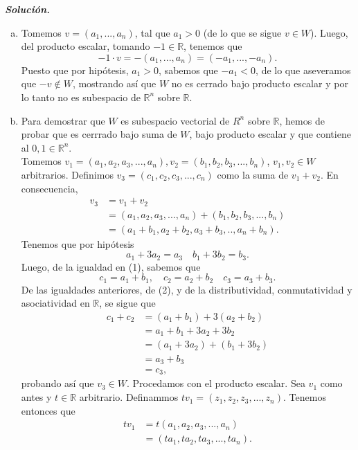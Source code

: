 \documentclass[11pt]{scrartcl}
\begin{document}
\textit{\textbf{Solución.}}
    \begin{enumerate}[a)]
        \item Tomemos $v=(a_1,...,a_n)$, tal que $a_1>0$ (de lo que se sigue $v\in W$). Luego, del producto escalar, tomando $-1\in \mathbb{R}$, tenemos que
        \[
        -1\cdot v=-(a_1,...,a_n)=(-a_1,...,-a_n).
        \]
        Puesto que por hipótesis, $a_1 > 0$, sabemos que $-a_1<0$, de lo que aseveramos que $-v\notin W$, mostrando así
        que $W$ no es cerrado bajo producto escalar y por lo tanto no es subespacio de $\mathbb{R}^n$ sobre $\mathbb{R}$.
        \item Para demostrar que $W$ es subespacio vectorial de $R^n$ sobre $\mathbb{R}$, hemos de probar que es cerrrado bajo suma de $W$, bajo producto escalar y que contiene al $0,1\in \mathbb{R}^n$.
        \\ Tomemos $v_1=(a_1,a_2,a_3,...,a_n),v_2=(b_1,b_2,b_3,...,b_n)$, $v_1,v_2 \in W$ arbitrarios. Definimos $v_3=(c_1,c_2,c_3,...,c_n)$ como la suma de $v_1+v_2$. En consecuencia,
        \begin{align*}
            v_3&=v_1+v_2 \\
            &=(a_1,a_2,a_3,...,a_n)+(b_1,b_2,b_3,...,b_n)\\
            &=(a_1+b_1,a_2+b_2,a_3+b_3,..,a_n+b_n). \tag{1}
        \end{align*}
        Tenemos que por hipótesis
        \[
        a_1+3a_2=a_3 \quad b_1+3b_2=b_3. \tag{2}
        \]
        Luego, de la igualdad en (1), sabemos que
        \[
        c_1=a_1+b_1, \quad c_2=a_2+b_2 \quad c_3=a_3+b_3.
        \]
        De las igualdades anteriores, de (2), y de la distributividad, conmutatividad y asociatividad en $\mathbb{R}$, se sigue que
        \begin{align*}
            c_1+c_2&=(a_1+b_1)+3(a_2+b_2) \\
            &=a_1+b_1+3a_2+3b_2 \\
            &=(a_1+3a_2)+(b_1+3b_2) \\
            &=a_3+b_3 \\
            &=c_3,
        \end{align*}
        probando así que $v_3 \in W$. Procedamos con el producto escalar. Sea $v_1$ como antes y $t\in \mathbb{R}$ arbitrario. Definammos $tv_1=(z_1,z_2,z_3,...,z_n)$.
        Tenemos entonces que
        \begin{align*}
            tv_1&=t(a_1,a_2,a_3,...,a_n) \\
            &=(ta_1,ta_2,ta_3,...,ta_n). \tag{3}

\end{align*}
\end{enumerate}
\end{document}
